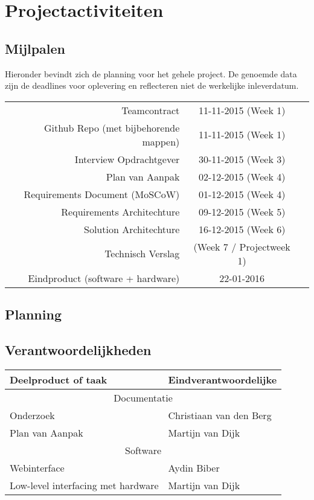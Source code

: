 \chapter{Projectactiviteiten}
\section{Mijlpalen}
Hieronder bevindt zich de planning voor het gehele project. De genoemde data zijn de deadlines voor oplevering en reflecteren niet de werkelijke inleverdatum.

\begin{tabular}{ r | c r }
  Teamcontract & 11-11-2015 (Week 1) \\
  Github Repo (met bijbehorende mappen) & 11-11-2015 (Week 1) \\
  Interview Opdrachtgever & 30-11-2015 (Week 3) \\
  Plan van Aanpak & 02-12-2015 (Week 4) \\
  Requirements Document (MoSCoW) & 01-12-2015 (Week 4) \\
  Requirements Architechture &  09-12-2015 (Week 5) \\
  Solution Architechture & 16-12-2015 (Week 6) \\
  Technisch Verslag	& (Week 7 / Projectweek 1) \\
  Eindproduct (software + hardware)	& 22-01-2016 \\
\end{tabular}

\section{Planning}


\section{Verantwoordelijkheden}
\begin{tabular}{ p{5cm} | l }
\textbf{Deelproduct of taak} & \textbf{Eindverantwoordelijke}\\
\hline
\multicolumn{2}{c}{Documentatie}\\
\hline
Onderzoek & Christiaan van den Berg \\
Plan van Aanpak & Martijn van Dijk \\
\hline
\multicolumn{2}{c}{Software}\\
\hline
Webinterface & Aydin Biber\\
Low-level interfacing met hardware & Martijn van Dijk\\
\end{tabular}